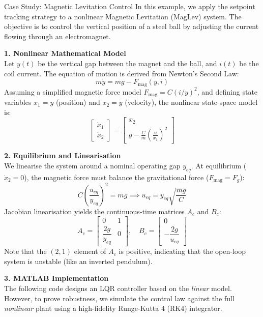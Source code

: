 \begin{examplebox}{Case Study: Magnetic Levitation Control}
	In this example, we apply the setpoint tracking strategy to a nonlinear Magnetic Levitation (MagLev) system. The objective is to control the vertical position of a steel ball by adjusting the current flowing through an electromagnet.
	
	\textbf{1. Nonlinear Mathematical Model} \\
	Let $y(t)$ be the vertical gap between the magnet and the ball, and $i(t)$ be the coil current. The equation of motion is derived from Newton's Second Law:
	\[
	m \ddot{y} = m g - F_{\text{mag}}(y, i)
	\]
	Assuming a simplified magnetic force model $F_{\text{mag}} = C (i/y)^2$, and defining state variables $x_1 = y$ (position) and $x_2 = \dot{y}$ (velocity), the nonlinear state-space model is:
	\begin{equation}
		\begin{bmatrix} \dot{x}_1 \\ \dot{x}_2 \end{bmatrix} 
		= 
		\begin{bmatrix} x_2 \\ g - \frac{C}{m} \left( \frac{u}{x_1} \right)^2 \end{bmatrix}
	\end{equation}
	
	\textbf{2. Equilibrium and Linearisation} \\
	We linearise the system around a nominal operating gap $y_{eq}$. At equilibrium ($\dot{x}_2 = 0$), the magnetic force must balance the gravitational force ($F_{\text{mag}} = F_g$):
	\[
	C \left( \frac{u_{eq}}{y_{eq}} \right)^2 = mg \implies u_{eq} = y_{eq} \sqrt{\frac{mg}{C}}
	\]
	Jacobian linearisation yields the continuous-time matrices $A_c$ and $B_c$:
	\[
	A_c = \begin{bmatrix} 0 & 1 \\[10pt] \dfrac{2g}{y_{eq}} & 0 \end{bmatrix}, \quad 
	B_c = \begin{bmatrix} 0 \\[10pt] -\dfrac{2g}{u_{eq}} \end{bmatrix}
	\]
	Note that the $(2,1)$ element of $A_c$ is positive, indicating that the open-loop system is unstable (like an inverted pendulum).
	
	\textbf{3. MATLAB Implementation} \\
	The following code designs an LQR controller based on the \textit{linear} model. However, to prove robustness, we simulate the control law against the full \textit{nonlinear} plant using a high-fidelity Runge-Kutta 4 (RK4) integrator.
	

\end{examplebox}
